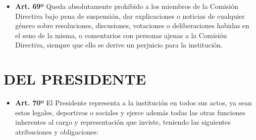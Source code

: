 \documentclass[openany]{book}
\providecommand{\tightlist}{%
  \setlength{\itemsep}{0pt}\setlength{\parskip}{0pt}}
\begin{document}
\begin{itemize}
\tightlist
\item
  \textbf{Art. 69º}
  Queda absolutamente prohibido a los miembros de la Comisión Directiva bajo pena de suspensión, dar explicaciones o noticias de cualquier género sobre resoluciones, discusiones, votaciones o deliberaciones habidas en el seno de la misma, o comentarios con personas ajenas a la Comisión Directiva, siempre que ello se derive un perjuicio para la institución.
\end{itemize}

\hypertarget{cap8}{%
\chapter{DEL PRESIDENTE}\label{cap8}}

\begin{itemize}
\tightlist
\item
  \textbf{Art. 70º}
  El Presidente representa a la institución en todos sus actos, ya sean estos legales, deportivos o sociales y ejerce además todas las otras funciones inherentes al cargo y representación que inviste, teniendo las siguientes atribuciones y obligaciones:


\end{itemize}
\end{document}
